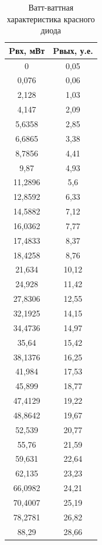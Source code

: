 \documentclass[a4paper,12pt]{article}
\begin{document}
\begin{table}[]
	
	\caption{Ватт-ваттная характеристика красного диода}
	\begin{tabular}{|c|c|}
	\hline
	Pвх, мВт & Pвых, у.е. \\ \hline
	0        & 0,05       \\ \hline
	0,076    & 0,06       \\ \hline
	2,128    & 1,03       \\ \hline
	4,147    & 2,09       \\ \hline
	5,6358   & 2,85       \\ \hline
	6,6865   & 3,38       \\ \hline
	8,7856   & 4,41       \\ \hline
	9,87     & 4,93       \\ \hline
	11,2896  & 5,6        \\ \hline
	12,8592  & 6,33       \\ \hline
	14,5882  & 7,12       \\ \hline
	16,0362  & 7,77       \\ \hline
	17,4833  & 8,37       \\ \hline
	18,4258  & 8,76       \\ \hline
	21,634   & 10,12      \\ \hline
	24,928   & 11,42      \\ \hline
	27,8306  & 12,55      \\ \hline
	32,1925  & 14,15      \\ \hline
	34,4736  & 14,97      \\ \hline
	35,64    & 15,42      \\ \hline
	38,1376  & 16,25      \\ \hline
	41,984   & 17,53      \\ \hline
	45,899   & 18,77      \\ \hline
	47,4129  & 19,22      \\ \hline
	48,8642  & 19,67      \\ \hline
	52,539   & 20,77      \\ \hline
	55,76    & 21,59      \\ \hline
	59,631   & 22,64      \\ \hline
	62,135   & 23,23      \\ \hline
	66,0982  & 24,21      \\ \hline
	70,4007  & 25,19      \\ \hline
	78,2781  & 26,82      \\ \hline
	88,29    & 28,66      \\ \hline
	\end{tabular}
	\end{table}
\end{document}
